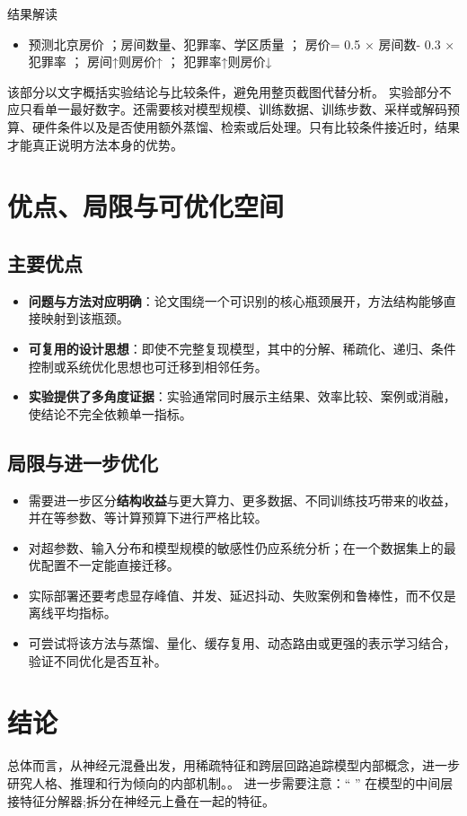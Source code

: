\documentclass[UTF8,11pt,a4paper]{ctexart}
\newcommand{\term}[1]{\textbf{\textcolor{mainblue}{#1}}}
\begin{document}
\begin{notebox}{结果解读}
\begin{itemize}
\item 预测北京房价 ；房间数量、犯罪率、学区质量 ； 房价= 0.5 × 房间数- 0.3 × 犯罪率 ； 房间↑则房价↑ ； 犯罪率↑则房价↓
\end{itemize}
\end{notebox}

该部分以文字概括实验结论与比较条件，避免用整页截图代替分析。
实验部分不应只看单一最好数字。还需要核对模型规模、训练数据、训练步数、采样或解码预算、硬件条件以及是否使用额外蒸馏、检索或后处理。只有比较条件接近时，结果才能真正说明方法本身的优势。

\section{优点、局限与可优化空间}
\subsection{主要优点}
\begin{itemize}
\item \term{问题与方法对应明确}：论文围绕一个可识别的核心瓶颈展开，方法结构能够直接映射到该瓶颈。
\item \term{可复用的设计思想}：即使不完整复现模型，其中的分解、稀疏化、递归、条件控制或系统优化思想也可迁移到相邻任务。
\item \term{实验提供了多角度证据}：实验通常同时展示主结果、效率比较、案例或消融，使结论不完全依赖单一指标。
\end{itemize}

\subsection{局限与进一步优化}
\begin{itemize}
\item 需要进一步区分\term{结构收益}与更大算力、更多数据、不同训练技巧带来的收益，并在等参数、等计算预算下进行严格比较。
\item 对超参数、输入分布和模型规模的敏感性仍应系统分析；在一个数据集上的最优配置不一定能直接迁移。
\item 实际部署还要考虑显存峰值、并发、延迟抖动、失败案例和鲁棒性，而不仅是离线平均指标。
\item 可尝试将该方法与蒸馏、量化、缓存复用、动态路由或更强的表示学习结合，验证不同优化是否互补。
\end{itemize}

\section{结论}
总体而言，从神经元混叠出发，用稀疏特征和跨层回路追踪模型内部概念，进一步研究人格、推理和行为倾向的内部机制。。 进一步需要注意：“ ” 在模型的中间层接特征分解器;拆分在神经元上叠在一起的特征。
\end{document}
